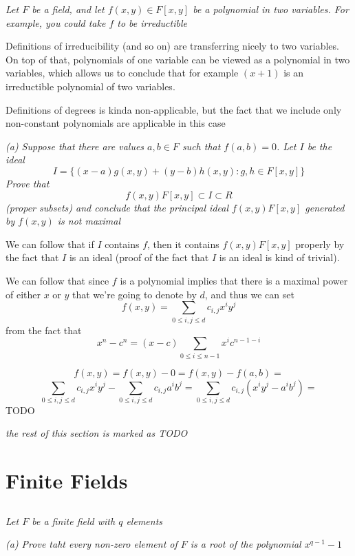 \documentclass[11pt,oneside,titlepage]{book}
\newcommand{\set}[1]{\{ #1 \}}
\begin{document}
\textit{Let $F$ be a field, and let $f(x, y) \in F[x, y]$ be a
  polynomial in two variables. For example, you could take $f$ to be
  irreductible}

Definitions of irreducibility (and so on) are transferring nicely
to two variables. On top of that, polynomials of one variable can be
viewed as a polynomial in two variables, which allows us to conclude
that for example $(x + 1)$ is an irreductible polynomial of two
variables.

Definitions of degrees is kinda non-applicable, but the fact that we
include only non-constant polynomials are applicable in this case

\textit{(a) Suppose that there are values $a, b \in F$ such that $f(a,
  b) = 0$. Let $I$ be the ideal
  $$I = \set{(x - a) g(x, y) + (y - b) h(x, y): g, h \in F[x, y]}$$
  Prove that
  $$f(x, y)F[x, y] \subset I \subset R$$
  (proper subsets) and conclude that the principal ideal $f(x, y)F[x,
  y]$ generated by $f(x, y)$ is not maximal }


We can follow that if $I$ contains $f$, then it contains $f(x, y)F[x,
y]$ properly by the fact that $I$ is an ideal (proof of the fact that
$I$ is an ideal is kind of trivial).

We can follow that since $f$ is a polynomial implies that there is a
maximal power of either $x$ or $y$ that we're going to denote by $d$,
and thus we can set
$$f(x, y) = \sum_{0 \leq i, j \leq d}{c_{i, j} x^i y^j} $$
from the fact that
$$x^n - c^n = (x - c) \sum_{0 \leq i \leq n - 1}{x^i c^{n - 1 - i}}$$

$$f(x,y) = f(x, y) - 0 = f(x, y) - f(a, b) = $$
$$ \sum_{0 \leq i, j \leq d}{c_{i, j} x^i y^j}  - \sum_{0 \leq i, j \leq d}{c_{i, j} a^i b^j} =
\sum_{0 \leq i, j \leq d}{c_{i, j} (x^i y^j - a^i b^j)}= $$
TODO

\textit{the rest of this section is marked as TODO}

\section{Finite Fields}

\subsection{}

\textit{Let $F$ be a finite field with $q$ elements}

\textit{(a) Prove taht every non-zero element of $F$ is a root of the
polynomial $x^{q - 1} - 1$}
\end{document}
